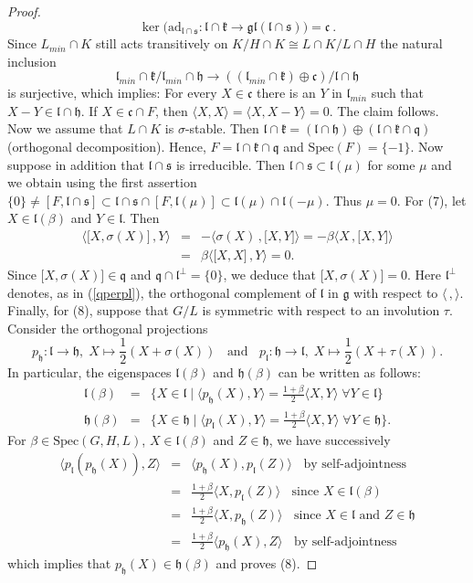\documentclass[10]{amsart}
\theoremstyle{remark}
\theoremstyle{definition}
\numberwithin{equation}{section}
\newcommand{\ad}{\text{ad}}
\newcommand{\fc}{{\mathfrak c}}
\newcommand{\fg}{{\mathfrak g}}
\newcommand{\fgl}{{\mathfrak{gl}}}
\newcommand{\fh}{{\mathfrak h}}
\newcommand{\fk}{{\mathfrak k}}
\newcommand{\fl}{{\mathfrak l}}
\newcommand{\fq}{{\mathfrak q}}
\newcommand{\fs}{{\mathfrak s}}
\newcommand{\IP}[2]{\langle#1\,, #2\rangle}     %
\begin{document}
{\begin{proof}
$$ \ker\Big (\ad_{\fl\cap\fs} :\fl\cap \fk \rightarrow \fgl(\fl\cap\fs)\Big )=\fc\ .$$
Since $L_{min}\cap K$ still acts transitively on $K/H\cap K\cong L\cap K/L\cap H$ the natural inclusion
$$   \fl_{min}\cap\fk/\fl_{min}\cap \fh \rightarrow ((\fl_{min}\cap\fk)\oplus\fc )/\fl\cap\fh $$
is surjective, which implies: For every $X\in\fc$ there is an $Y$ in $\fl_{min}$ such that $X-Y\in \fl\cap\fh$. If $X\in\fc\cap F$, then
$\langle X,X\rangle=\langle X,X-Y\rangle=0$. The claim follows. Now we assume that $L\cap K$ is $\sigma$-stable. Then $\fl\cap\fk=(\fl\cap\fh)\oplus(\fl\cap\fk\cap\fq)$ (orthogonal decomposition). Hence, $F=\fl\cap\fk\cap\fq$ and $\text{Spec}(F)=\{-1\}$. 
Now suppose in addition that $\fl\cap\fs$ is irreducible. Then $\fl\cap\fs\subset\fl(\mu)$ for some $\mu$ and we obtain using the first assertion 
$\{0\}\neq [F,\fl\cap\fs]\subset\fl\cap\fs\cap [F,\fl(\mu)]\subset\fl(\mu)\cap\fl(-\mu)$. Thus $\mu=0$. For (7), let $X\in\fl(\beta)$ and $Y\in \fl$. Then
%
\begin{eqnarray*} 
\IP{\lbrack X,\sigma(X)\rbrack}{Y}&=&-\IP{ \sigma(X)}{\lbrack X,Y\rbrack}
=-\beta\IP{X}{\lbrack X,Y\rbrack}\\&=&\beta\IP{\lbrack X,X\rbrack}{Y}
=0.
\end{eqnarray*}
Since $\lbrack X,\sigma(X)\rbrack\in\fq$ and $\fq\cap\fl^{\perp}=\{0\}$, we deduce that $\lbrack X,\sigma(X)\rbrack=0$. 
Here $\fl^{\perp}$ denotes, as in (\ref{qperpl}), the orthogonal complement of $\fl$ in $\fg$ with respect to $\IP{}{}$. Finally, for (8), suppose that $G/L$ is symmetric with respect to an involution $\tau$. Consider the orthogonal projections 
$$p_\fh:\fl\rightarrow\fh,\; X\mapsto\frac{1}{2}(X+\sigma(X))\;\;\text{ and }\;\;p_\fl:\fh\rightarrow\fl,\; X\mapsto\frac{1}{2}(X+\tau(X)).$$ 
In particular, the eigenspaces $\fl(\beta)$ and $\fh(\beta)$ can be written as follows:
%
\begin{eqnarray*}
\fl(\beta)&=&\Big\{X\in\fl\mid\langle p_\fh(X),Y\rangle=\frac{1+\beta}{2}\langle X,Y\rangle\;\forall Y\in\fl\Big\}\\
\fh(\beta)&=&\Big\{X\in\fh\mid\langle p_\fl(X),Y\rangle=\frac{1+\beta}{2}\langle X,Y\rangle\;\forall Y\in\fh\Big\}.
\end{eqnarray*}
%
For $\beta\in\text{Spec}(G,H,L)$, $X\in\fl(\beta)$ and $Z\in\fh$, we have successively
%
\begin{eqnarray*}
\langle p_\fl(p_\fh(X)),Z\rangle&=&\langle p_\fh(X),p_\fl(Z)\rangle\;\;\text{ by self-adjointness}\\
&=&\frac{1+\beta}{2}\langle X,p_\fl(Z)\rangle\;\;\text{ since }X\in\fl(\beta)\\
&=&\frac{1+\beta}{2}\langle X,p_\fh(Z)\rangle\;\;\text{ since }X\in\fl\text{ and }Z\in\fh\\
&=&\frac{1+\beta}{2}\langle p_\fh(X),Z\rangle\;\;\text{ by self-adjointness}
\end{eqnarray*}
%
which implies that $p_\fh(X)\in\fh(\beta)$ and proves (8).
\end{proof}
%

}
\end{document}
